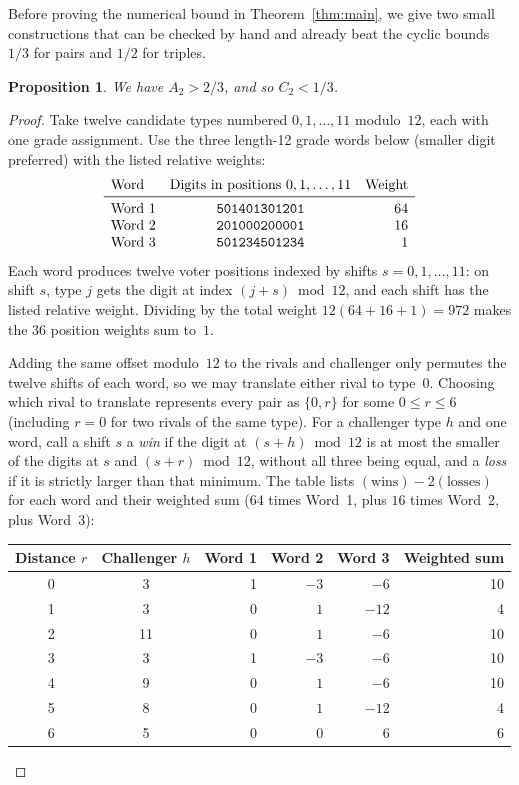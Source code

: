 \documentclass[11pt,letterpaper]{article}
\theoremstyle{cleanthm}
\newtheorem{proposition}[lemma]{Proposition}
\begin{document}
Before proving the numerical bound in Theorem~\ref{thm:main}, we give two small constructions that
can be checked by hand and already beat the cyclic bounds \(1/3\) for pairs and \(1/2\) for
triples.

\begin{proposition}\label{prop:pair-third}
We have \(A_2>2/3\), and so \(C_2<1/3\).
\end{proposition}

\begin{proof}
Take twelve candidate types numbered \(0,1,\ldots,11\) modulo~\(12\), each with one grade
assignment. Use the three length-12 grade words below (smaller digit preferred) with the listed
relative weights:
\[
\begin{array}{l@{\quad}c@{\quad}r}
 \text{Word} & \text{Digits in positions } 0,1,\ldots,11 & \text{Weight}\\\midrule
 \text{Word 1} & \mathtt{501401301201} & 64\\
 \text{Word 2} & \mathtt{201000200001} & 16\\
 \text{Word 3} & \mathtt{501234501234} & 1
\end{array}
\]
Each word produces twelve voter positions indexed by shifts \(s=0,1,\ldots,11\): on shift \(s\),
type \(j\) gets the digit at index \((j+s)\bmod 12\), and each shift has the listed relative
weight. Dividing by the total weight \(12(64+16+1)=972\) makes the \(36\) position weights sum
to~\(1\).

Adding the same offset modulo~\(12\) to the rivals and challenger only permutes the twelve shifts
of each word, so we may translate either rival to type~0. Choosing which rival to translate
represents every pair as \(\{0,r\}\) for some \(0\le r\le 6\) (including \(r=0\) for two rivals of
the same type). For a challenger type \(h\) and one word, call a shift \(s\) a \emph{win} if the
digit at \((s+h)\bmod 12\) is at most the smaller of the digits at \(s\) and \((s+r)\bmod 12\),
without all three being equal, and a \emph{loss} if it is strictly larger than that minimum. The
table lists \((\text{wins})-2(\text{losses})\) for each word and their weighted sum (\(64\) times
Word~1, plus \(16\) times Word~2, plus Word~3):

\begin{center}\small
\setlength{\tabcolsep}{10pt}\renewcommand{\arraystretch}{1.12}
\begin{tabular}{@{}c c rrr r@{}}
\toprule
Distance \(r\) & Challenger \(h\) & Word 1 & Word 2 & Word 3 & Weighted sum\\
\midrule
0 & 3  & 1 & \(-3\) & \(-6\)  & 10\\
1 & 3  & 0 & \(1\)  & \(-12\) & 4\\
2 & 11 & 0 & \(1\)  & \(-6\)  & 10\\
3 & 3  & 1 & \(-3\) & \(-6\)  & 10\\
4 & 9  & 0 & \(1\)  & \(-6\)  & 10\\
5 & 8  & 0 & \(1\)  & \(-12\) & 4\\
6 & 5  & 0 & \(0\)  & \(6\)   & 6\\
\bottomrule
\end{tabular}
\end{center}


\end{proof}
\end{document}
